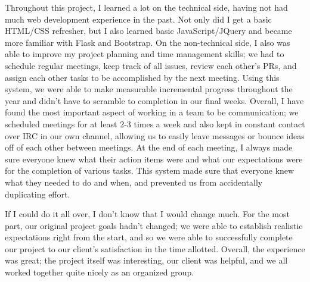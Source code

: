 Throughout this project, I learned a lot on the technical side, having not had
much web development experience in the past.  Not only did I get a basic
HTML/CSS refresher, but I also learned basic JavaScript/JQuery and became more
familiar with Flask and Bootstrap.  On the non-technical side, I also was able
to improve my project planning and time management skills; we had to schedule
regular meetings, keep track of all issues, review each other's PRs, and assign
each other tasks to be accomplished by the next meeting.  Using this system, we
were able to make measurable incremental progress throughout the year and
didn't have to scramble to completion in our final weeks.  Overall, I have
found the most important aspect of working in a team to be communication; we
scheduled meetings for at least 2-3 times a week and also kept in constant
contact over IRC in our own channel, allowing us to easily leave messages or
bounce ideas off of each other between meetings.  At the end of each meeting, I
always made sure everyone knew what their action items were and what our
expectations were for the completion of various tasks.  This system made sure
that everyone knew what they needed to do and when, and prevented us from
accidentally duplicating effort.

If I could do it all over, I don't know that I would change much.  For the most
part, our original project goals hadn't changed; we were able to establish
realistic expectations right from the start, and so we were able to
successfully complete our project to our client's satisfaction in the time
allotted.  Overall, the experience was great; the project itself was
interesting, our client was helpful, and we all worked together quite nicely as
an organized group.
